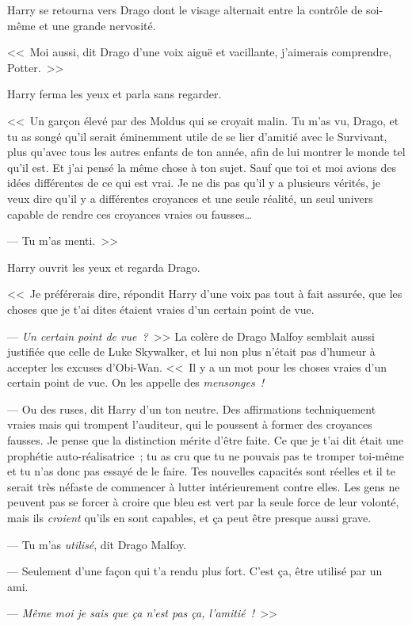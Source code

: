 Harry se retourna vers Drago dont le visage alternait entre la contrôle de soi-même et une grande nervosité.

<<~Moi aussi, dit Drago d'une voix aiguë et vacillante, j'aimerais comprendre, Potter.~>>

Harry ferma les yeux et parla sans regarder.

<<~Un garçon élevé par des Moldus qui se croyait malin. Tu m'as vu, Drago, et tu as songé qu'il serait éminemment utile de se lier d'amitié avec le Survivant, plus qu'avec tous les autres enfants de ton année, afin de lui montrer le monde tel qu'il est. Et j'ai pensé la même chose à ton sujet. Sauf que toi et moi avions des idées différentes de ce qui est vrai. Je ne dis pas qu'il y a plusieurs vérités, je veux dire qu'il y a différentes croyances et une seule réalité, un seul univers capable de rendre ces croyances vraies ou fausses…

--- Tu m'as menti.~>>

Harry ouvrit les yeux et regarda Drago.

<<~Je préférerais dire, répondit Harry d'une voix pas tout à fait assurée, que les choses que je t'ai dites étaient vraies d'un certain point de vue.

--- \emph{Un certain point de vue~?}~>> La colère de Drago Malfoy semblait aussi justifiée que celle de Luke Skywalker, et lui non plus n'était pas d'humeur à accepter les excuses d'Obi-Wan. <<~Il y a un mot pour les choses vraies d'un certain point de vue. On les appelle des \emph{mensonges~!}

--- Ou des ruses, dit Harry d'un ton neutre. Des affirmations techniquement vraies mais qui trompent l'auditeur, qui le poussent à former des croyances fausses. Je pense que la distinction mérite d'être faite. Ce que je t'ai dit était une prophétie auto-réalisatrice~; tu as cru que tu ne pouvais pas te tromper toi-même et tu n'as donc pas essayé de le faire. Tes nouvelles capacités sont réelles et il te serait très néfaste de commencer à lutter intérieurement contre elles. Les gens ne peuvent pas se forcer à croire que bleu est vert par la seule force de leur volonté, mais ils \emph{croient} qu'ils en sont capables, et ça peut être presque aussi grave.

--- Tu m'as \emph{utilisé}, dit Drago Malfoy.

--- Seulement d'une façon qui t'a rendu plus fort. C'est ça, être utilisé par un ami.

--- \emph{Même moi je sais que ça n'est pas ça, l'amitié~!}~>>

